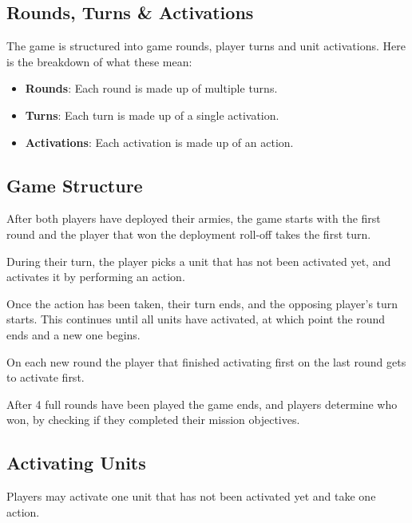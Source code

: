 \documentclass[9pt, a4paper, bookmarks=false]{extarticle}            %
\begin{document}
\begin{multicols}{2}

\subsection{Rounds, Turns \& Activations}

The game is structured into game rounds, player turns and unit activations. Here is the breakdown of what these mean:

\begin{itemize}
  \item \textbf{Rounds}: Each round is made up of multiple turns.
  \item \textbf{Turns}: Each turn is made up of a single activation.
  \item \textbf{Activations}: Each activation is made up of an action.
\end{itemize}

\subsection{Game Structure}

After both players have deployed their armies, the game starts with the first round and the player that won the deployment roll-off takes the first turn.

During their turn, the player picks a unit that has not been activated yet, and activates it by performing an action.

Once the action has been taken, their turn ends, and the opposing player’s turn starts. This continues until all units have activated, at which point the round ends and a new one begins.

On each new round the player that finished activating first on the last round gets to activate first.

After 4 full rounds have been played the game ends, and players determine who won, by checking if they completed their mission objectives.

\subsection{Activating Units}

Players may activate one unit that has not been activated yet and take one action.


\end{multicols}
\end{document}

